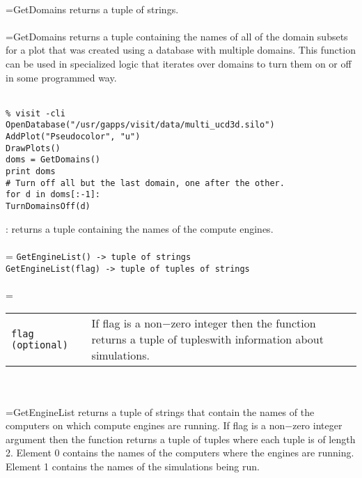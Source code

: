 \documentclass[10pt,a4paper]{report}
\begin{document}
 \\ 
\hangindent=\parindent GetDomains returns a tuple of strings. \\[-3mm] 

 \\ 
\hangindent=\parindent GetDomains returns a tuple containing the names of all of the domain subsets for a plot that was created using a database with multiple domains. This function can be used in specialized logic that iterates over domains to turn them on or off in some programmed way. \\[-3mm] 

\\[-6mm]
\begin{verbatim}% visit -cli
OpenDatabase("/usr/gapps/visit/data/multi_ucd3d.silo")
AddPlot("Pseudocolor", "u")
DrawPlots()
doms = GetDomains()
print doms
# Turn off all but the last domain, one after the other.
for d in doms[:-1]:
TurnDomainsOff(d)
\end{verbatim}
\newpage


{}
: returns a tuple containing the names of the compute engines.\\[-3mm]

 \\ 
\hangindent=\parindent 
\verb!GetEngineList() -> tuple of strings!\\ 
\verb!GetEngineList(flag) -> tuple of tuples of strings!\\ [-3mm]

 \\ 
\hangindent=\parindent 
\begin{tabular}{lp{9cm}}
\verb!flag (optional)! & If flag is a non$-$zero integer then the function returns a tuple of tupleswith information about simulations. \\
\end{tabular} \\[-2mm]


 \\ 
\hangindent=\parindent GetEngineList returns a tuple of strings that contain the names of the computers on which compute engines are running. If flag is a non$-$zero integer argument then the function returns a tuple of tuples where each tuple is of length 2. Element 0 contains the names of the computers where the engines are running. Element 1 contains the names of the simulations being run. \\[-3mm] 
\end{document}
